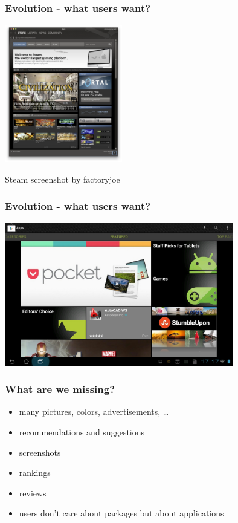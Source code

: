 \documentclass{beamer}
\begin{document}
\begin{frame}
\frametitle{Evolution - what users want?}
\begin{center}
\includegraphics[height=6cm]{steam}

\small Steam screenshot by factoryjoe
\end{center}
\end{frame}

\begin{frame}
\frametitle{Evolution - what users want?}
\begin{center}
\includegraphics[width=10cm]{play_store}
\end{center}
\end{frame}

\begin{frame}[t]
\frametitle{What are we missing?}
\begin{itemize}
\item many pictures, colors, advertisements, \dots
\pause
\vspace{0.5cm}
\item recommendations and suggestions
\item screenshots
\item rankings
\item reviews
\item users don't care about packages but about applications
\end{itemize}
\end{frame}
\end{document}
